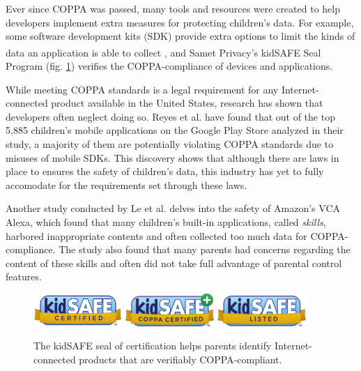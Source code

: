 \documentclass[12pt]{ucthesis}
\begin{document}
Ever since COPPA was passed, many tools and resources were created to help developers implement extra measures for protecting children's data. For example, some software development kits (SDK) provide extra options to limit the kinds of data an application is able to collect \cite{reyes:coppa}, and Samet Privacy's kidSAFE\textsuperscript{\textregistered} Seal Program (fig. \ref{fig:kidsafe}) verifies the COPPA-compliance of devices and applications.

While meeting COPPA standards is a legal requirement for any Internet-connected product available in the United States, research has shown that developers often neglect doing so. Reyes et al. \cite{reyes:coppa} have found that out of the top 5,885 children's mobile applications on the Google Play Store analyzed in their study, a majority of them are potentially violating COPPA standards due to misuses of mobile SDKs. This discovery shows that although there are laws in place to ensures the safety of children's data, this industry has yet to fully accomodate for the requirements set through these laws. 

Another study conducted by Le et al. \cite{le:skillbot} delves into the safety of Amazon's VCA Alexa, which found that many children's built-in applications, called \textit{skills}, harbored inappropriate contents and often collected too much data for COPPA-compliance. The study also found that many parents had concerns regarding the content of these skills and often did not take full advantage of parental control features.

\begin{figure}
    \centering
    \includegraphics[width=0.3\textwidth]{kidsafe1.png}
    \includegraphics[width=0.3\textwidth]{kidsafe2.png}
    \includegraphics[width=0.3\textwidth]{kidsafe3.png}
    \caption{The kidSAFE seal of certification helps parents identify Internet-connected products that are verifiably COPPA-compliant.}
    \label{fig:kidsafe}
\end{figure}
\end{document}
